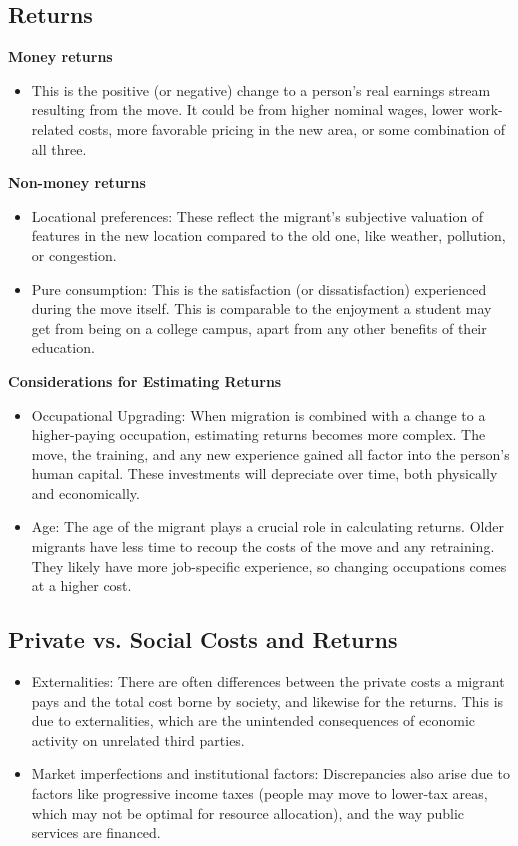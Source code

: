 \documentclass{article}
\numberwithin{equation}{section} %
\begin{document}
\subsection{Returns} %
\label{sub:returns}
\textbf{Money returns}
\begin{itemize}
  \item This is the positive (or negative) change to a person’s real earnings stream resulting from the move. It could be from higher nominal wages, lower work-related costs, more favorable pricing in the new area, or some combination of all three.
\end{itemize}

\textbf{Non-money returns}
\begin{itemize}
  \item Locational preferences: These reflect the migrant's subjective valuation of features in the new location compared to the old one, like weather, pollution, or congestion.
  \item Pure consumption: This is the satisfaction (or dissatisfaction) experienced during the move itself. This is comparable to the enjoyment a student may get from being on a college campus, apart from any other benefits of their education. 
\end{itemize}

\textbf{Considerations for Estimating Returns}
\begin{itemize}
  \item Occupational Upgrading: When migration is combined with a change to a higher-paying occupation, estimating returns becomes more complex. The move, the training, and any new experience gained all factor into the person's human capital. These investments will depreciate over time, both physically and economically. 
  \item Age: The age of the migrant plays a crucial role in calculating returns.  Older migrants have less time to recoup the costs of the move and any retraining.  They likely have more job-specific experience, so changing occupations comes at a higher cost. 
\end{itemize}

\subsection{Private vs. Social Costs and Returns} %
\label{sub:Private vs. Social Costs and Returns}
\begin{itemize}
  \item Externalities: There are often differences between the private costs a migrant pays and the total cost borne by society, and likewise for the returns. This is due to externalities, which are the unintended consequences of economic activity on unrelated third parties. 
  \item Market imperfections and institutional factors: Discrepancies also arise due to factors like progressive income taxes (people may move to lower-tax areas, which may not be optimal for resource allocation), and the way public services are financed.  
\end{itemize}
\end{document}
